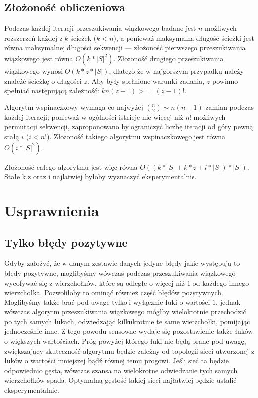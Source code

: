 \documentclass{article}
\begin{document}
\subsection{Złożoność obliczeniowa}
Podczas każdej iteracji przeszukiwania wiązkowego badane jest $n$ możliwych rozszerzeń każdej z $k$ ścieżek ($k<n$), a ponieważ maksymalna długość ścieżki jest równa maksymalnej długości sekwencji --- złożoność pierwszego przeszukiwania wiązkowego jest równa $O(k*|S|^2)$. Złożoność drugiego przeszukiwania wiązkowego wynosi $O(k*z*|S|)$, dlatego że w najgorszym przypadku należy znaleźć ścieżkę o długości $z$. Aby były spełnione warunki zadania, $z$ powinno spełniać następującą zależność: $kn(z-1)>=(z-1)!$.

Algorytm wspinaczkowy wymaga co najwyżej ${{n}\choose{2}}\sim n(n-1)$ zamian podczas każdej iteracji; ponieważ w ogólności istnieje nie więcej niż $n!$ możliwych permutacji sekwencji, zaproponowano by ograniczyć liczbę iteracji od góry pewną stałą $i$ ($i<n!$). Złożoność takiego algorytmu wspinaczkowego jest równa $O(i*|S|^2)$.

Złożoność całego algorytmu jest więc równa $O((k*|S|+k*z+i*|S|)*|S|)$. Stałe k,z oraz i najłatwiej byłoby wyznaczyć eksperymentalnie.

\section{Usprawnienia}
\subsection{Tylko błędy pozytywne}
Gdyby założyć, że w danym zestawie danych jedyne błędy jakie występują to błędy pozytywne, moglibyśmy wówczas podczas przeszukiwania wiązkowego wycofywać się z wierzchołków, które są odległe o więcej niż $1$ od każdego innego wierzchołka. Pozwoliłoby to ominąć również część błędów pozytywnych. Moglibyśmy także brać pod uwagę tylko i wyłącznie łuki o wartości $1$, jednak wówczas algorytm przeszukiwania wiązkowego mógłby wielokrotnie przechodzić po tych samych łukach, odwiedzając kilkukrotnie te same wierzchołki, pomijając jednocześnie inne. Z tego powodu sensowne wydaje się pozostawienie także łuków o większych wartościach. Próg powyżej którego łuki nie będą brane pod uwagę, zwiększający skuteczność algorytmu będzie zależny od topologii sieci utworzonej z łuków o wartości mniejszej bądź równej temu progowi. Jeśli sieć ta będzie odpowiednio gęsta, wówczas szansa na wielokrotne odwiedzanie tych samych wierzchołków spada. Optymalną gęstość takiej sieci najłatwiej będzie ustalić eksperymentalnie.
\end{document}
